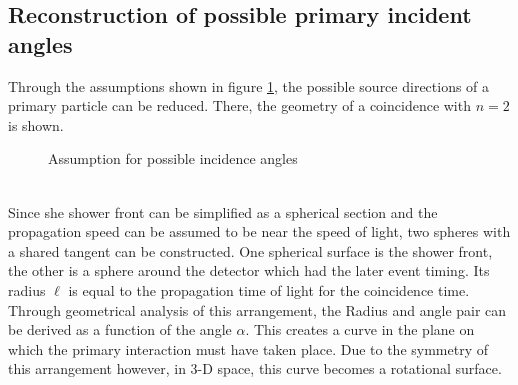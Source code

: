 \documentclass[abstract,toc,los,lof,english,10pt,glossary,acronyms,lotl]{jluthesis}
\begin{document}
\subsection{Reconstruction of possible primary incident angles} \label{sec:reconstruction}
Through the assumptions shown in figure \ref{fig:angle-assumptions}, the possible source directions of a primary particle can be reduced. There, the geometry of a coincidence with $n=2$ is shown.
\begin{figure}[ht!]
	\centering
	\caption{Assumption for possible incidence angles}
	\label{fig:angle-assumptions}
\end{figure} \\
Since she shower front can be simplified as a spherical section and the propagation speed can be assumed to be near the speed of light, two spheres with a shared tangent can be constructed. One spherical surface is the shower front, the other is a sphere around the detector which had the later event timing. Its radius $\ell$ is equal to the propagation time of light for the coincidence time. Through geometrical analysis of this arrangement, the Radius and angle pair can be derived as a function of the angle $\alpha$. This creates a curve in the plane on which the primary interaction must have taken place. Due to the symmetry of this arrangement however, in 3-D space, this curve becomes a rotational surface. \\
\end{document}

